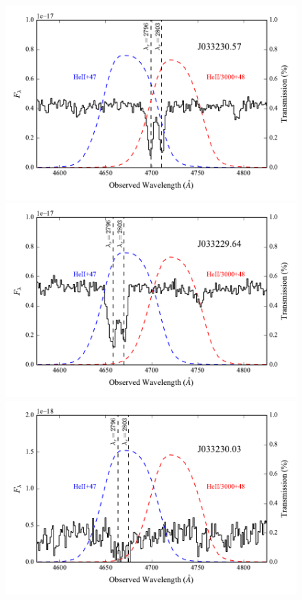 \documentclass[twocolumn]{aastex6}
\begin{document}
\begin{figure}[!htb]
\centering
\includegraphics[scale=0.58]{filt_57_spectra.pdf}
\includegraphics[scale=0.58]{filt_64_spectra.pdf}
\includegraphics[scale=0.58]{filt_03_spectra.pdf}

\end{figure}
\end{document}
